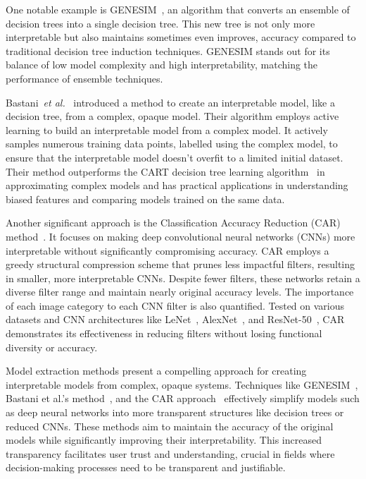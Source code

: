 One notable example is GENESIM~\cite{VandewieleJOTH16}, an algorithm that converts an ensemble of decision trees into a single decision tree. This new tree is not only more interpretable but also maintains sometimes even improves, accuracy compared to traditional decision tree induction techniques. GENESIM stands out for its balance of low model complexity and high interpretability, matching the performance of ensemble techniques.

Bastani~\textit{et al.}~\cite{BastaniKB17a} introduced a method to create an interpretable model, like a decision tree, from a complex, opaque model. Their algorithm employs active learning to build an interpretable model from a complex model. It actively samples numerous training data points, labelled using the complex model, to ensure that the interpretable model doesn't overfit to a limited initial dataset. Their method outperforms the CART decision tree learning algorithm~\cite{BreimanFOS84} in approximating complex models and has practical applications in understanding biased features and comparing models trained on the same data.

Another significant approach is the Classification Accuracy Reduction (CAR) method~\cite{VandewieleJOTH16}. It focuses on making deep convolutional neural networks (CNNs) more interpretable without significantly compromising accuracy. CAR employs a greedy structural compression scheme that prunes less impactful filters, resulting in smaller, more interpretable CNNs. Despite fewer filters, these networks retain a diverse filter range and maintain nearly original accuracy levels. The importance of each image category to each CNN filter is also quantified. Tested on various datasets and CNN architectures like LeNet~\cite{LeCunBDHHHJ89}, AlexNet~\cite{KrizhevskySH12}, and ResNet-50~\cite{HeZRS15}, CAR demonstrates its effectiveness in reducing filters without losing functional diversity or accuracy.

Model extraction methods present a compelling approach for creating interpretable models from complex, opaque systems. Techniques like GENESIM~\cite{VandewieleJOTH16}, Bastani et al.'s method~\cite{BastaniKB17a}, and the CAR approach~\cite{VandewieleJOTH16} effectively simplify models such as deep neural networks into more transparent structures like decision trees or reduced CNNs. These methods aim to maintain the accuracy of the original models while significantly improving their interpretability. This increased transparency facilitates user trust and understanding, crucial in fields where decision-making processes need to be transparent and justifiable.

